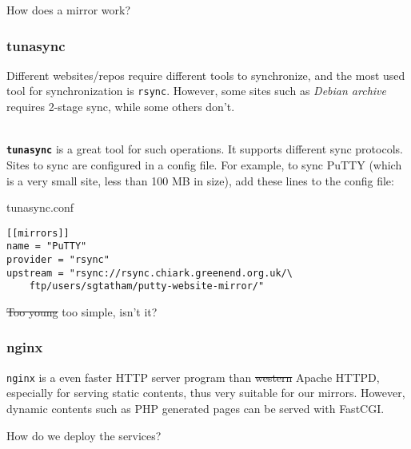 \documentclass{beamer}
\begin{document}

\begin{frame}
\huge{\centerline{How does a mirror work?}}
\end{frame}


\begin{frame}[fragile]
\frametitle{tunasync}

Different websites/repos require different tools to synchronize, and the most
used tool for synchronization is \texttt{rsync}. However, some sites such as
\textit{Debian archive} requires 2-stage sync, while some others don't.\\~

\textbf{\texttt{tunasync}} is a great tool for such operations. It supports
different sync protocols. Sites to sync are configured in a config file. For
example, to sync PuTTY (which is a very small site, less than 100 MB in size),
add these lines to the config file:

\begin{block}{tunasync.conf}
\begin{verbatim}
[[mirrors]]
name = "PuTTY"
provider = "rsync"
upstream = "rsync://rsync.chiark.greenend.org.uk/\
	ftp/users/sgtatham/putty-website-mirror/"
\end{verbatim}
\end{block}

\sout{Too young} too simple, isn't it?

\end{frame}


\begin{frame}
\frametitle{nginx}
\texttt{nginx} is a even faster HTTP server program than \sout{western} Apache
HTTPD, especially for serving static contents, thus very suitable for our
mirrors. However, dynamic contents such as PHP generated pages can be served
with FastCGI.
\end{frame}


\begin{frame}
\huge{\centerline{How do we deploy the services?}}
\end{frame}

\end{document}
